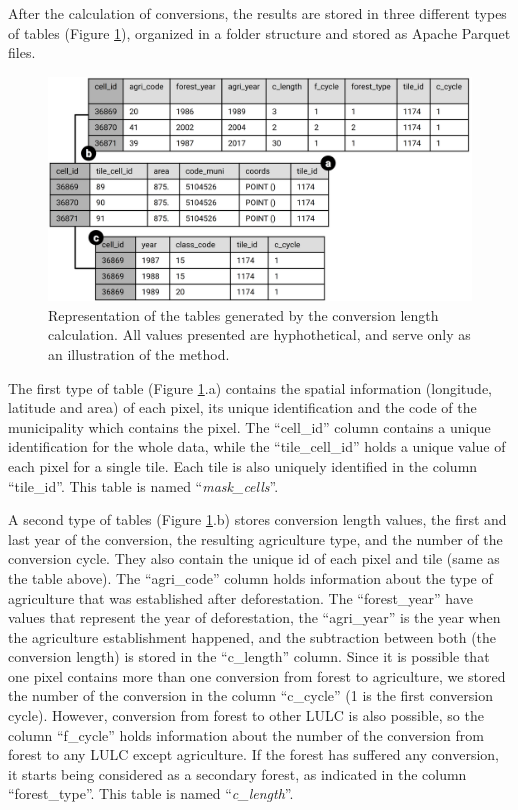 \documentclass[essd, manuscript]{copernicus}
\begin{document}
After the calculation of conversions, the results are stored in three different types of tables (Figure \ref{fig:tables-plot}), organized in a folder structure and stored as Apache Parquet files.

\begin{figure}[h]
\includegraphics[width=17cm]{figs/tables_scheme} \caption{ Representation of the tables generated by the conversion length calculation. All values presented are hyphothetical, and serve only as an illustration of the method.}\label{fig:tables-plot}
\end{figure}

The first type of table (Figure \ref{fig:tables-plot}.a) contains the spatial information (longitude, latitude and area) of each pixel, its unique identification and the code of the municipality which contains the pixel.
The ``cell\_id'' column contains a unique identification for the whole data, while the ``tile\_cell\_id'' holds a unique value of each pixel for a single tile.
Each tile is also uniquely identified in the column ``tile\_id''.
This table is named ``\emph{mask\_cells}''.

A second type of tables (Figure \ref{fig:tables-plot}.b) stores conversion length values, the first and last year of the conversion, the resulting agriculture type, and the number of the conversion cycle.
They also contain the unique id of each pixel and tile (same as the table above).
The ``agri\_code'' column holds information about the type of agriculture that was established after deforestation.
The ``forest\_year'' have values that represent the year of deforestation, the ``agri\_year'' is the year when the agriculture establishment happened, and the subtraction between both (the conversion length) is stored in the ``c\_length'' column.
Since it is possible that one pixel contains more than one conversion from forest to agriculture, we stored the number of the conversion in the column ``c\_cycle'' (1 is the first conversion cycle).
However, conversion from forest to other LULC is also possible, so the column ``f\_cycle'' holds information about the number of the conversion from forest to any LULC except agriculture.
If the forest has suffered any conversion, it starts being considered as a secondary forest, as indicated in the column ``forest\_type''.
This table is named ``\emph{c\_length}''.
\end{document}
